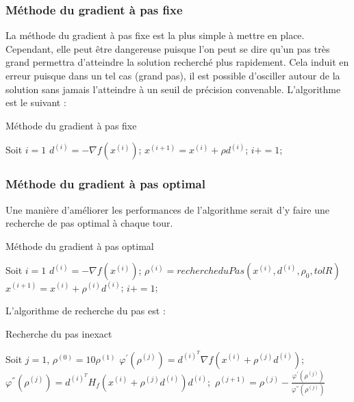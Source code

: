 \subsubsection{Méthode du gradient à pas fixe}
La méthode du gradient à pas fixe est la plus simple à mettre en place. Cependant, elle peut être dangereuse puisque l'on peut se dire qu'un pas très grand permettra d'atteindre la solution recherché plus rapidement. Cela induit en erreur puisque dans un tel cas (grand pas), il est possible d'osciller autour de la solution sans jamais l'atteindre à un seuil de précision convenable. L'algorithme est le suivant :
\begin{algorithm}
	\caption{Méthode du gradient à pas fixe}
	\begin{algorithmic}[1]
		\State Soit $i=1$
		\State $d^{(i)}=-\nabla f(x^{(i)})$;
		\State $x^{(i+1)}=x^{(i)}+\rho d^{(i)}$;
		\State $i+=1$;
		\EndWhile
		\EndProcedure
	\end{algorithmic}
\end{algorithm}
\subsubsection{Méthode du gradient à pas optimal}
Une manière d'améliorer les performances de l'algorithme serait d'y faire une recherche de pas optimal à chaque tour.
\begin{algorithm}[H]
	\caption{Méthode du gradient à pas  optimal}
	\begin{algorithmic}[1]
		\State Soit $i=1$
		\State $d^{(i)}=-\nabla f(x^{(i)})$;
		\State $\rho^{(i)}=rechercheduPas(x^{(i)},d^{(i)},\rho_0,tolR)$
		\State $x^{(i+1)}=x^{(i)}+\rho^{(i)} d^{(i)}$;
		\State $i+=1$;
		\EndWhile
		\EndProcedure
	\end{algorithmic}
\end{algorithm}
L'algorithme de recherche du pas est :
\begin{algorithm}[H]
	\caption{Recherche du pas inexact}
	\begin{algorithmic}[1]
		\State Soit $j=1$, $\rho^{(0)}=10\rho^{(1)}$
		\State $\varphi^{'}(\rho^{(j)})=d^{(i)^T}\nabla f(x^{(i)}+\rho^{(j)}d^{(i)})$;
		\State $\varphi^{''}(\rho^{(j)})=d^{(i)^T} H_f(x^{(i)}+\rho^{(j)}d^{(i)})d^{(i)};$
		\State $\rho^{(j+1)}=\rho^{(j)}-\frac{\varphi^{'}(\rho^{(j)})}{\varphi^{''}(\rho^{(j)})}$
		\EndWhile
		\EndProcedure
		\end{algorithmic}
	\end{algorithm}
